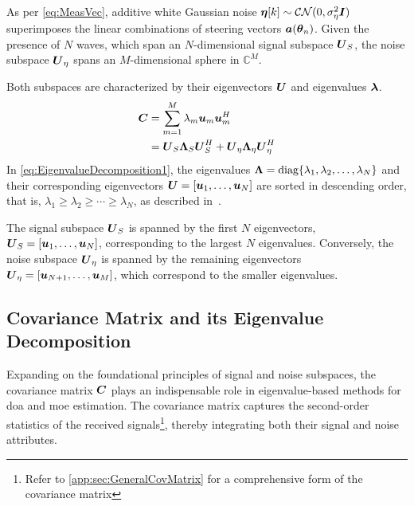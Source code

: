 As per \autoref{eq:MeasVec}, additive white Gaussian noise \( \boldsymbol{\eta}[k] \sim \mathcal{C}\mathcal{N}(0,\sigma_\eta^2\boldsymbol{I}) \)
superimposes the linear combinations of steering vectors \( \boldsymbol{a}(\boldsymbol{\theta}_n) \).
Given the presence of \( N \) waves, which span an \( N \)-dimensional signal subspace \( \boldsymbol{U}_S \),
the noise subspace \( \boldsymbol{U}_\eta \) spans an \( M \)-dimensional sphere in \( \mathbb{C}^M \).

Both subspaces are characterized by their eigenvectors \( \boldsymbol{U} \) and eigenvalues \( \boldsymbol{\lambda} \).
\begin{align}
    \boldsymbol{C} & = \sum_{m=1}^M \lambda_m \boldsymbol{u}_m \boldsymbol{u}_m^H                                                 \\
            & = \boldsymbol{U}_S \boldsymbol{\Lambda}_S \boldsymbol{U}_S^H + \boldsymbol{U}_{\eta} \boldsymbol{\Lambda}_{\eta} \boldsymbol{U}_{\eta}^H
    \label{eq:EigenvalueDecomposition1}
\end{align}
In \autoref{eq:EigenvalueDecomposition1}, the eigenvalues
\( \boldsymbol{\Lambda} = \text{diag}\{\lambda_1, \lambda_2, \ldots, \lambda_N\} \) and their corresponding eigenvectors
\( \boldsymbol{U} = [\boldsymbol{u}_{1},\ldots,\boldsymbol{u}_{N}] \) are sorted in descending order, that is,
\( \lambda_1 \geq \lambda_2 \geq \cdots \geq \lambda_N \), as described in~\cite{tuncer.ch5}.

The signal subspace \( \boldsymbol{U}_S \) is spanned by the first \( N \) eigenvectors,
\( \boldsymbol{U}_S = [\boldsymbol{u}_{1},\ldots,\boldsymbol{u}_{N}] \), corresponding to the largest \( N \) eigenvalues.
Conversely, the noise subspace \( \boldsymbol{U}_{\eta} \) is spanned by the remaining eigenvectors
\( \boldsymbol{U}_{\eta} = [\boldsymbol{u}_{N+1}, \ldots, \boldsymbol{u}_{M}] \), which correspond to the smaller eigenvalues.


\subsection{Covariance Matrix and its Eigenvalue Decomposition}
Expanding on the foundational principles of signal and noise subspaces, the covariance matrix \( \boldsymbol{C} \) plays an
indispensable role in eigenvalue-based methods for \gls{doa} and \gls{moe} estimation. The covariance matrix captures
the second-order statistics of the received signals\footnote{Refer to \autoref{app:sec:GeneralCovMatrix} for a
    comprehensive form of the covariance matrix}, thereby integrating both their signal and noise attributes.

